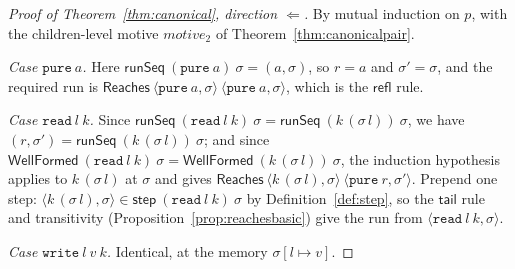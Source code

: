 \documentclass[11pt,a4paper]{article}
\theoremstyle{definition}
\theoremstyle{plain}
\theoremstyle{remark}
\newcommand{\st}{\sigma}
\newcommand{\runSeq}{\mathsf{runSeq}}
\newcommand{\wf}{\mathsf{WellFormed}}
\newcommand{\Reaches}{\mathsf{Reaches}}
\newcommand{\upd}[3]{#1[#2 \mapsto #3]}
\begin{document}
\begin{proof}[Proof of Theorem~\ref{thm:canonical}, direction $\Longleftarrow$]
By mutual induction on $p$, with the children-level motive $\mathit{motive}_2$ of
Theorem~\ref{thm:canonicalpair}.

\emph{Case $\texttt{pure}\ a$.} Here $\runSeq\ (\texttt{pure}\ a)\ \st = (a,\st)$, so $r = a$
and $\st' = \st$, and the required run is
$\Reaches\ \langle \texttt{pure}\ a, \st\rangle\ \langle \texttt{pure}\ a, \st\rangle$, which
is the $\mathsf{refl}$ rule.

\emph{Case $\texttt{read}\ l\ k$.} Since
$\runSeq\ (\texttt{read}\ l\ k)\ \st = \runSeq\ (k\,(\st\,l))\ \st$, we have
$(r,\st') = \runSeq\ (k\,(\st\,l))\ \st$; and since
$\wf\ (\texttt{read}\ l\ k)\ \st = \wf\ (k\,(\st\,l))\ \st$, the induction hypothesis applies
to $k\,(\st\,l)$ at $\st$ and gives
$\Reaches\ \langle k\,(\st\,l), \st\rangle\ \langle \texttt{pure}\ r, \st'\rangle$. Prepend
one step: $\langle k\,(\st\,l), \st\rangle \in \mathsf{step}\ (\texttt{read}\ l\ k)\ \st$ by
Definition~\ref{def:step}, so the $\mathsf{tail}$ rule and transitivity
(Proposition~\ref{prop:reachesbasic}) give the run from $\langle \texttt{read}\ l\ k, \st\rangle$.

\emph{Case $\texttt{write}\ l\ v\ k$.} Identical, at the memory $\upd{\st}{l}{v}$.


\end{proof}
\end{document}
